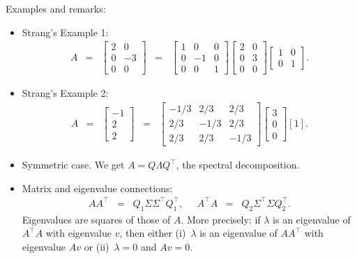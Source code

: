\documentclass[11pt]{article}
\begin{document}
Examples and remarks:
\begin{itemize}
\item Strang's Example 1:
\begin{eqnarray*}
    A &=& \left[ \begin{array}{lr} 2 & 0 \\ 0 & -3  \\ 0 & 0 \end{array} \right]
    \;\;=\;\;
        \left[ \begin{array}{rrr} 1 & 0 & 0 \\ 0 & -1 & 0 \\ 0 & 0 & 1 \end{array} \right]
        \left[ \begin{array}{rr} 2 & 0 \\ 0 & 3 \\ 0 & 0 \end{array} \right]
        \left[ \begin{array}{rr} 1 & 0 \\ 0 & 1 \end{array} \right] .
\end{eqnarray*}

\item Strang's Example 2:
\begin{eqnarray*}
    A &=& \left[ \begin{array}{r} -1 \\ 2  \\ 2 \end{array} \right]
    \;\;=\;\;
        \left[ \begin{array}{rrr} -1/3 & 2/3 & 2/3 \\ 2/3 & -1/3 & 2/3 \\ 2/3 & 2/3 & -1/3 \end{array} \right]
        \left[ \begin{array}{r} 3 \\ 0  \\ 0 \end{array} \right]
        \left[ 1 \right]  .
\end{eqnarray*}

\item Symmetric case.  We get $ A = Q \Lambda Q^\top$, the spectral decomposition.

\item Matrix and eigenvalue connections:
\begin{eqnarray*}
    A A^\top \;\;=\;\; Q_1 \Sigma \Sigma^\top Q_1^\top,
    \;\;\;\;\;
    A^\top A \;\;=\;\; Q_2 \Sigma^\top \Sigma Q_2^\top .
\end{eqnarray*}
Eigenvalues are squares of those of $A$.
More precisely:  if $\lambda$ is an eigenvalue of $A^\top A$ with eigenvalue $v$,
then either (i)~$\lambda$ is an eigenvalue of $A A ^\top$ with eigenvalue $A v$ or
(ii)~$\lambda=0$ and $Av = 0$.


\end{itemize}
\end{document}

